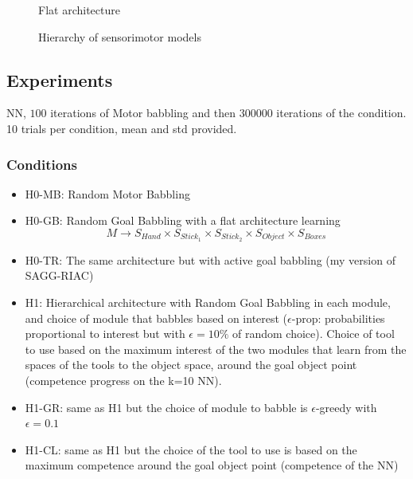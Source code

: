 \documentclass[10pt,letterpaper]{article}
\begin{document}
			\begin{figure}[t]
				\center
				
				\caption{Flat architecture}
				\label{F}					
			\end{figure}
			
			\begin{figure}[t]
				\center
				
				\caption{Hierarchy of sensorimotor models}
				\label{H1}					
			\end{figure}

				
		

	
	\subsection{Experiments}
		
		NN, $100$ iterations of Motor babbling and then $300000$ iterations of the condition. 10 trials per condition, mean and std provided.
		
		
		\subsubsection{Conditions}
			
			\begin{itemize}
			
				\item H0-MB: Random Motor Babbling
				\item H0-GB: Random Goal Babbling with a flat architecture learning $$M \rightarrow S_{Hand} \times S_{Stick_1} \times S_{Stick_2} \times S_{Object} \times S_{Boxes}$$
				\item H0-TR: The same architecture but with active goal babbling (my version of SAGG-RIAC)
				\item H1: Hierarchical architecture with Random Goal Babbling in each module, and choice of module that babbles based on interest ($\epsilon$-prop: probabilities proportional to interest but with $\epsilon=10\%$ of random choice). Choice of tool to use based on the maximum interest of the two modules that learn from the spaces of the tools to the object space, around the goal object point (competence progress on the k=10 NN).
				\item H1-GR: same as H1 but the choice of module to babble is $\epsilon$-greedy with $\epsilon=0.1$
				\item H1-CL: same as H1 but the choice of the tool to use is based on the maximum competence around the goal object point (competence of the NN)
			
			\end{itemize}
				
\end{document}
